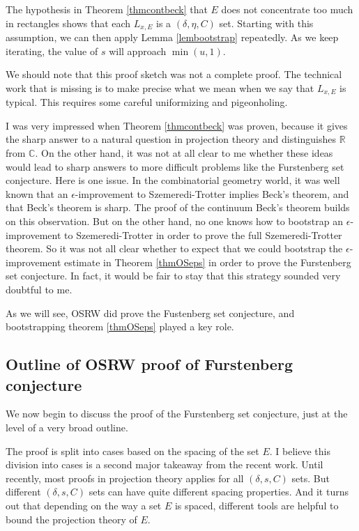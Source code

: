 \documentclass[12pt]{amsart}
\newcommand{\CC}{\mathbb{C}}
\newcommand{\RR}{\mathbb{R}}
\begin{document}
The hypothesis in Theorem \ref{thmcontbeck} that $E$ does not concentrate too much in rectangles shows that each $L_{x,E}$ is a $(\delta,  \eta, C)$ set.   Starting with this assumption,  we can then apply Lemma \ref{lembootstrap} repeatedly.   As we keep iterating,  the value of $s$ will approach $\min(u,1)$.  
 
 We should note that this proof sketch was not a complete proof.   The technical work that is missing is to make precise what we mean when we say that $L_{x,E}$ is typical.   This requires some careful uniformizing and pigeonholing.  

I was very impressed when Theorem \ref{thmcontbeck} was proven,  because it gives the sharp answer to a natural question in projection theory and distinguishes $\RR$ from $\CC$.   On the other hand,  it was not at all clear to me whether these ideas would lead to sharp answers to more difficult problems like the Furstenberg set conjecture.   Here is one issue.   In the combinatorial geometry world,  it was well known that an $\epsilon$-improvement to Szemeredi-Trotter implies Beck's theorem, and that Beck's theorem is sharp.   The proof of the continuum Beck's theorem builds on this observation.   But on the other hand,  no one knows how to bootstrap an $\epsilon$-improvement to Szemeredi-Trotter in order to prove the full Szemeredi-Trotter theorem.   So it was not all clear whether to expect that we could bootstrap the $\epsilon$-improvement estimate in Theorem \ref{thmOSeps} in order to prove the Furstenberg set conjecture.   In fact, it would be fair to stay that this strategy sounded very doubtful to me.

As we will see,  OSRW did prove the Fustenberg set conjecture,  and bootstrapping theorem \ref{thmOSeps} played a key role.


\subsection{Outline of OSRW proof of Furstenberg conjecture}

We now begin to discuss the proof of the Furstenberg set conjecture, just at the level of a very broad outline.

The proof is split into cases based on the spacing of the set $E$.   I believe this division into cases is a second major takeaway from the recent work.   Until recently,  most proofs in projection theory applies for all $(\delta,  s, C)$ sets.   But different $(\delta, s, C)$ sets can have quite different spacing properties.   And it turns out that depending on the way a set $E$ is spaced,  different tools are helpful to bound the projection theory of $E$.  
\end{document}
